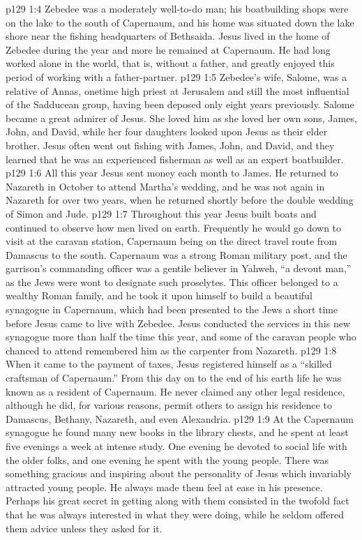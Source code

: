 \vs p129 1:4 Zebedee was a moderately well\hyp{}to\hyp{}do man; his boatbuilding shops were on the lake to the south of Capernaum, and his home was situated down the lake shore near the fishing headquarters of Bethsaida. Jesus lived in the home of Zebedee during the year and more he remained at Capernaum. He had long worked alone in the world, that is, without a father, and greatly enjoyed this period of working with a father\hyp{}partner.
\vs p129 1:5 Zebedee’s wife, Salome, was a relative of Annas, onetime high priest at Jerusalem and still the most influential of the Sadducean group, having been deposed only eight years previously. Salome became a great admirer of Jesus. She loved him as she loved her own sons, James, John, and David, while her four daughters looked upon Jesus as their elder brother. Jesus often went out fishing with James, John, and David, and they learned that he was an experienced fisherman as well as an expert boatbuilder.
\vs p129 1:6 \pc All this year Jesus sent money each month to James. He returned to Nazareth in October to attend Martha’s wedding, and he was not again in Nazareth for over two years, when he returned shortly before the double wedding of Simon and Jude.
\vs p129 1:7 \pc Throughout this year Jesus built boats and continued to observe how men lived on earth. Frequently he would go down to visit at the caravan station, Capernaum being on the direct travel route from Damascus to the south. Capernaum was a strong Roman military post, and the garrison’s commanding officer was a gentile believer in Yahweh, “a devout man,” as the Jews were wont to designate such proselytes. This officer belonged to a wealthy Roman family, and he took it upon himself to build a beautiful synagogue in Capernaum, which had been presented to the Jews a short time before Jesus came to live with Zebedee. Jesus conducted the services in this new synagogue more than half the time this year, and some of the caravan people who chanced to attend remembered him as the carpenter from Nazareth.
\vs p129 1:8 When it came to the payment of taxes, Jesus registered himself as a “skilled craftsman of Capernaum.” From this day on to the end of his earth life he was known as a resident of Capernaum. He never claimed any other legal residence, although he did, for various reasons, permit others to assign his residence to Damascus, Bethany, Nazareth, and even Alexandria.
\vs p129 1:9 At the Capernaum synagogue he found many new books in the library chests, and he spent at least five evenings a week at intense study. One evening he devoted to social life with the older folks, and one evening he spent with the young people. There was something gracious and inspiring about the personality of Jesus which invariably attracted young people. He always made them feel at ease in his presence. Perhaps his great secret in getting along with them consisted in the twofold fact that he was always interested in what they were doing, while he seldom offered them advice unless they asked for it.
